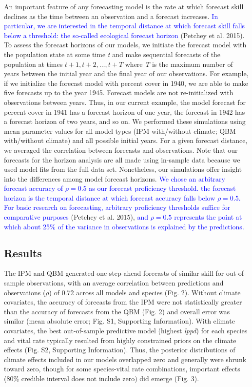 \documentclass[12pt,]{article}
\begin{document}
An important feature of any forecasting model is the rate at which
forecast skill declines as the time between an observation and a
forecast increases.
\textcolor{blue}{In particular, we are interested in the temporal distance at which forecast skill falls below a threshold: the so-called ecological forecast horizon}
(Petchey et al. 2015). To assess the forecast horizons of our models, we
initiate the forecast model with the population state at some time
\emph{t} and make sequential forecasts of the population at times
\(t+1, t+2, \dots, t+T\) where \emph{T} is the maximum number of years
between the initial year and the final year of our observations. For
example, if we initialize the forecast model with percent cover in 1940,
we are able to make five forecasts up to the year 1945. Forecast models
are not re-initialized with observations between years. Thus, in our
current example, the model forecast for percent cover in 1941 has a
forecast horizon of one year, the forecast in 1942 has a forecast
horizon of two years, and so on. We performed these simulations using
mean parameter values for all model types (IPM with/without climate; QBM
with/without climate) and all possible initial years. For a given
forecast distance, we averaged the correlation between forecasts and
observations. Note that our forecasts for the horizon analysis are all
made using in-sample data because we used model fits from the full data
set. Nonetheless, our simulations offer insight into the differences
among model forecast horizons.
\textcolor{blue}{We chose an arbitrary forecast accuracy of $\rho = 0.5$ as our forecast proficiency threshold. the forecast horizon is the temporal distance at which forecast accuracy falls below $\rho = 0.5$.
For basic research on forecasting, arbitrary proficiency thresholds suffice for comparative purposes}
(Petchey et al. 2015),
\textcolor{blue}{and $\rho = 0.5$ represents the point at which about 25\% of the variance in observations is explained by the predictions.}

\subsection{Results}\label{results}

The IPM and QBM generated one-step-ahead forecasts of similar skill for
out-of-sample observations, with an average correlation between
predictions and observations (\(\rho\)) of 0.72 across all models and
species (Fig. 2). Without climate covariates, the accuracy of forecasts
from the IPM were not statistically greater than the accuracy of
forecasts from the QBM (Fig. 2) and overall error was similar (mean
absolute error; Fig. S1, Supporting Information). With climate
covariates, the best out-of-sample predictive model (highest
\emph{lppd}) for each species and vital rate typically resulted from
highly constrained priors on the climate effects (Fig. S2, Supporting
Information). Thus, the posterior distributions of climate effects
included in our models overlapped zero and generally were shrunk toward
zero, though for some species-vital rate combinations, important effects
(80\% credible interval does not include zero) did emerge (Fig. 3).
\end{document}
